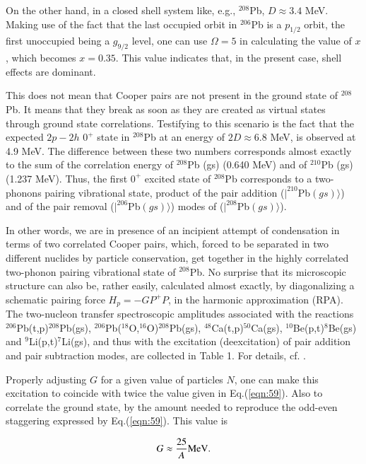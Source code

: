\documentclass[a4paper,14pt]{book}
\begin{document}
On the other hand, in a closed shell system like, e.g., $^{208}$Pb, $D \approx 3.4$ MeV. Making use of the fact that the last occupied orbit
in $^{206}$Pb is a $p_{1/2}$ orbit, the first unoccupied being a $g_{9/2}$ level, one can use $\Omega =5$ in calculating  the value of $x$, which
becomes $x =0.35$. This value indicates that, in the present case,  shell effects are dominant. 

This does not mean that Cooper pairs are not present in the ground state  of $^{208}$Pb. It means that  they break as soon as they are created as virtual states through ground state correlations. Testifying to this scenario is the fact that  the expected $2p-2h$ $0^+$ state in $^{208}$Pb  at an energy of $ 2 D  \approx 6.8$ MeV, is observed at
4.9 MeV. The difference between these two numbers corresponds almost exactly  to the sum of the  correlation energy of $^{208}$Pb (gs) (0.640 MeV)
and of $^{210}$Pb (gs) (1.237 MeV). Thus, the first $0^+$ excited state of $^{208}$Pb corresponds to a two-phonons pairing vibrational state, product of the pair addition ($|^{210}$Pb$(gs)\rangle$) and of the pair removal ($|^{206}$Pb$(gs)\rangle$) modes of ($|^{208}$Pb$(gs)\rangle$).

In other words, we are in  presence of an incipient attempt of condensation in terms of two  correlated Cooper pairs, which, forced to be separated  
in two different nuclides
by particle conservation, get together in the highly correlated two-phonon pairing vibrational state of $^{208}$Pb. 
No surprise that  its microscopic structure can also be, rather easily, calculated almost exactly, by diagonalizing a schematic pairing force 
$H_p = - G P^+P$, in the harmonic approximation (RPA). The two-nucleon transfer spectroscopic amplitudes associated with the  reactions 
$^{206}$Pb(t,p)$^{208}$Pb(gs), $^{206}$Pb($^{18}$O,$^{16}$O)$^{208}$Pb(gs), $^{48}$Ca(t,p)$^{50}$Ca(gs), $^{10}$Be(p,t)$^8$Be(gs) and $^9$Li(p,t)$^7$Li(gs), and thus with the excitation (deexcitation) of pair addition and pair subtraction modes, are collected in Table 1. 
For details, cf. \cite{Broglia:73a}. 


Properly adjusting $G$ for a given value of particles $N$, one can make this excitation to coincide with twice the value given in Eq.(\ref{eqn:59}). Also to correlate the ground state, by the amount needed to reproduce the odd-even staggering expressed by Eq.(\ref{eqn:59}). This value is

\begin{equation}
G \approx \frac{25}{A} {\rm MeV}.
\label{eqn:88}
\end{equation}
\end{document}
